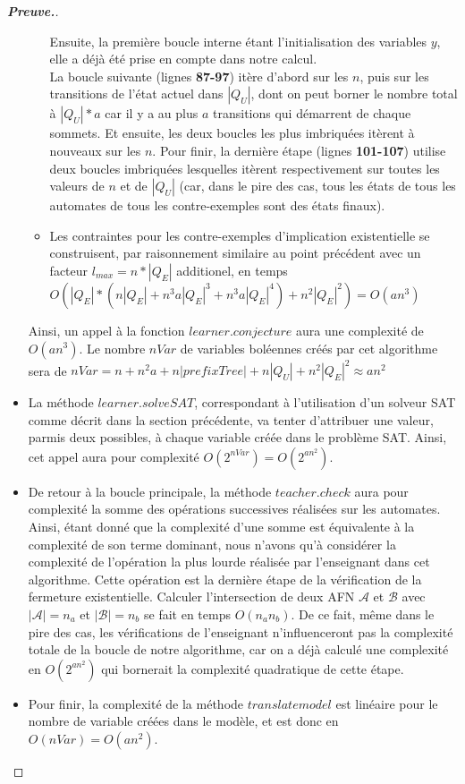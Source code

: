 \documentclass[12pt,a4paper,oneside,titlepage]{report}
\newenvironment{demonstration}{\begin{proof}[\textnormal{\textbf{Preuve.}}]}{\end{proof}}
\begin{document}
\begin{demonstration}
\begin{itemize}
\begin{itemize}
Ensuite, la première boucle interne étant l'initialisation des variables $y$, elle a déjà été prise en compte dans notre calcul.\\
La boucle suivante (lignes \textbf{87-97}) itère d'abord sur les $n$, puis sur les transitions de l'état actuel dans $|Q_U|$, dont on peut borner le nombre total à $|Q_U|*a$ car il y a au plus $a$ transitions qui démarrent de chaque sommets. Et ensuite, les deux boucles les plus imbriquées itèrent à nouveaux sur les $n$. Pour finir, la dernière étape (lignes \textbf{101-107})  utilise deux boucles imbriquées lesquelles itèrent respectivement sur toutes les valeurs de $n$ et de $|Q_U|$ (car, dans le pire des cas, tous les états de tous les automates de tous les contre-exemples sont des états finaux).
\item Les contraintes pour les contre-exemples d'implication existentielle se construisent, par raisonnement similaire au point précédent avec un facteur $l_{max}=n*|Q_E|$ additionel, en temps $O(|Q_E|*(n|Q_E|+n^3a|Q_E|^3+n^3a|Q_E|^4)+n^2|Q_E|^2)=O(an^3)$
\end{itemize}
Ainsi, un appel à la fonction $learner.conjecture$ aura une complexité de $O(an^3)$. Le nombre $nVar$ de variables boléennes créés par cet algorithme sera de $nVar=n+n^2a+n|prefixTree|+n|Q_U|+n^2|Q_E|^2\approx an^2$
\item La méthode $learner.solveSAT$, correspondant à l'utilisation d'un solveur SAT comme décrit dans la section précédente, va tenter d'attribuer une valeur, parmis deux possibles, à chaque variable créée dans le problème SAT. Ainsi, cet appel aura pour complexité $O(2^{ nVar})=O(2^{an^2})$.
\item De retour à la boucle principale, la méthode $teacher.check$ aura pour complexité la somme des opérations successives réalisées sur les automates. Ainsi, étant donné que la complexité d'une somme est équivalente à la complexité de son terme dominant, nous n'avons qu'à considérer la complexité de l'opération la plus lourde réalisée par l'enseignant dans cet algorithme. Cette opération est la dernière étape de la vérification de la fermeture existentielle. Calculer l'intersection de deux AFN $\mathcal{A}$ et $\mathcal{B}$ avec $|\mathcal{A}|=n_a$ et $|\mathcal{B}|=n_b$ se fait en temps $O(n_an_b)$. De ce fait, même dans le pire des cas, les vérifications de l'enseignant n'influenceront pas la complexité totale de la boucle de notre algorithme, car on a déjà calculé une complexité en $O(2^{an^2})$ qui bornerait la complexité quadratique de cette étape.
\item Pour finir, la complexité de la méthode $translatemodel$ est linéaire pour le nombre de variable créées dans le modèle, et est donc en $O(nVar)=O(an^2)$.

\end{itemize}
\end{demonstration}
\end{document}
